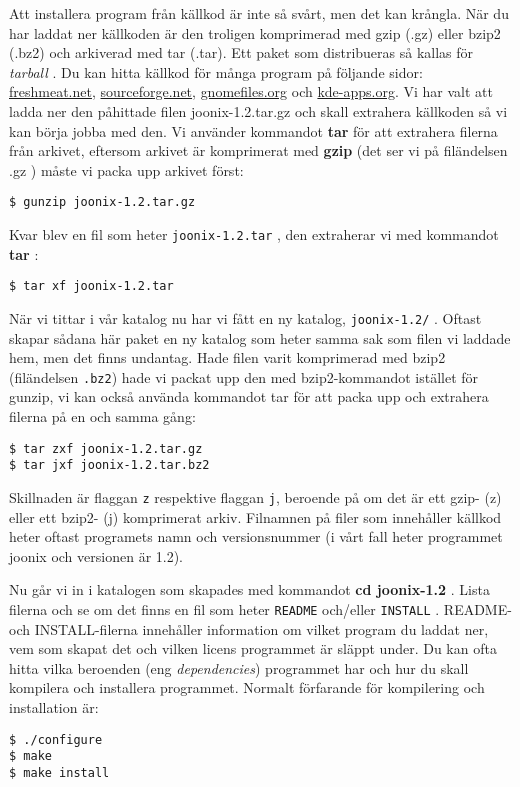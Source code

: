 \documentclass{article}
\begin{document}
Att installera program från källkod är inte så svårt, men det kan krångla. När du
har laddat ner källkoden är den troligen komprimerad med gzip (.gz) eller bzip2
(.bz2) och arkiverad med tar (.tar). Ett paket som distribueras så kallas för
\emph{tarball} . Du kan hitta källkod för många program på följande sidor:
\href{http://freshmeat.net/}{freshmeat.net},
\href{http://sourceforge.net/}{sourceforge.net},
\href{http://www.gnomefiles.org/}{gnomefiles.org} och
\href{http://www.kde-apps.org/}{kde-apps.org}. Vi har valt att ladda ner den
påhittade filen joonix-1.2.tar.gz och skall extrahera källkoden så vi kan börja
jobba med den. Vi använder kommandot \textbf{tar} för att extrahera filerna från
arkivet, eftersom arkivet är komprimerat med \textbf{gzip} (det ser vi på
filändelsen .gz ) måste vi packa upp arkivet först:
\begin{verbatim}
$ gunzip joonix-1.2.tar.gz
\end{verbatim}
Kvar blev en fil som heter \texttt{joonix-1.2.tar} , den extraherar vi med
kommandot \textbf{tar} :
\begin{verbatim}
$ tar xf joonix-1.2.tar
\end{verbatim}
När vi tittar i vår katalog nu har vi fått en ny katalog, \texttt{joonix-1.2/}
. Oftast skapar sådana här paket en ny katalog som heter samma sak som filen vi
laddade hem, men det finns undantag. Hade filen varit komprimerad med bzip2
(filändelsen \texttt{.bz2}) hade vi packat upp den med bzip2-kommandot istället
för gunzip, vi kan också använda kommandot tar för att packa upp och extrahera
filerna på en och samma gång:
\begin{verbatim}
$ tar zxf joonix-1.2.tar.gz
$ tar jxf joonix-1.2.tar.bz2
\end{verbatim}

Skillnaden är flaggan \texttt{z} respektive flaggan \texttt{j}, beroende på om
det är ett gzip- (z) eller ett bzip2- (j) komprimerat arkiv. Filnamnen på
filer som innehåller källkod heter oftast programets namn och versionsnummer
(i vårt fall heter programmet joonix och versionen är 1.2).

Nu går vi in i katalogen som skapades med kommandot \textbf{cd joonix-1.2} .
Lista filerna och se om det finns en fil som heter \texttt{README} och/eller
\texttt{INSTALL} . README- och INSTALL-filerna innehåller information om vilket
program du laddat ner, vem som skapat det och vilken licens programmet är släppt
under. Du kan ofta hitta vilka beroenden (eng \emph{dependencies}) programmet har
och hur du skall kompilera och installera programmet. Normalt förfarande för
kompilering och installation är:
\begin{verbatim}
$ ./configure
$ make
$ make install
\end{verbatim}
\end{document}
